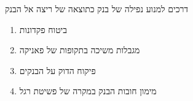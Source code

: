 \documentclass[usenames,dvipsnames,10pt]{beamer}
\begin{document}
\begin{RTL}
\begin{frame}[allowframebreaks]
    \framebreak
    \begin{block}{דרכים למנוע נפילה של בנק כתוצאה של ריצה אל הבנק}
        \begin{enumerate}
            \item ביטוח פקדונות
            \item מגבלות משיכה בתקופות של פאניקה
            \item פיקוח הדוק על הבנקים
            \item מימון חובות הבנק במקרה של פשיטת רגל
        \end{enumerate}
    \end{block}
    

\end{frame}




\end{RTL}
\end{document}
